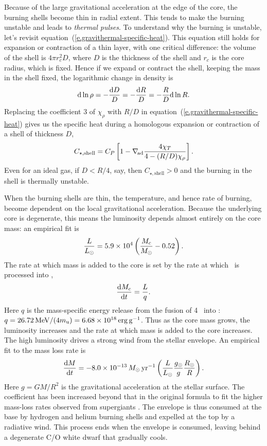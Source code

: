 Because of the large gravitational acceleration at the edge of the core, the burning shells become thin in radial extent.  This tends to make the burning unstable and leads to \emph{thermal pulses}.
To understand why the burning is unstable, let's revisit equation~(\ref{e.gravithermal-specific-heat}).  This equation still holds for expansion or contraction of a thin layer, with one critical difference: the volume of the shell is $4\pi r_{c}^{2}D$, where $D$ is the thickness of the shell and $r_{c}$ is the core radius, which is fixed. Hence if we expand or contract the shell, keeping the mass in the shell fixed, the logarithmic change in density is
\[ \mathrm{d}\ln\rho = -\frac{\mathrm{d} D}{D} = -\frac{\mathrm{d} R}{D} = -\frac{R}{D}\mathrm{d}\ln R. \]
Replacing the coefficient 3 of $\chi_{\rho}$ with $R/D$ in equation~(\ref{e.gravithermal-specific-heat}) gives us the specific heat during a homologous expansion or contraction of a shell of thickness $D$,
\begin{equation}\label{e.thin-shell-specific-heat}
 C_{\star,\mathrm{shell}} = C_{P}\left[1-\nabla_{\!\mathrm{ad}}\frac{4\chi_{T}}{4-(R/D)\chi_{\rho}}\right].
\end{equation}
Even for an ideal gas, if $D < R/4$, say, then $C_{\star,\mathrm{shell}} > 0$ and the burning in the shell is thermally unstable.

When the burning shells are thin, the temperature, and hence rate of burning, become dependent on the local gravitational acceleration.  Because the underlying core is degenerate, this means the luminosity depends almost entirely on the core mass: an empirical fit is \citep{Paczynski1970Evolution-of-Si}
\begin{equation}\label{e.paczynski}
\frac{L}{L_{\odot}} = 5.9\times 10^{4}\left(\frac{M_{c}}{M_\odot}-0.52\right).
\end{equation}
The rate at which mass is added to the core is set by the rate at which \hydrogen\ is processed into \helium,
\begin{equation}\label{e.mdot-core}
\frac{\mathrm{d} M_{c}}{\mathrm{d} t} = \frac{L}{q}.
\end{equation}
Here $q$ is the mass-specific energy release from the fusion of 4 \hydrogen\ into \helium: $q = 26.72\,\mathrm{M}\mathrm{eV}/(4m_\mathrm{u}) = 6.68\times 10^{18}\,\mathrm{erg}\,{\mathrm{g}}^{-1}$.  Thus as the core mass grows, the luminosity increases and the rate at which mass is added to the core increases.  The high luminosity drives a strong wind from the stellar envelope.  An empirical fit to the mass loss rate is \citep{Reimers1977On-the-absolute}
\begin{equation}\label{e.wind-loss}
\frac{\mathrm{d} M}{\mathrm{d} t} = - 8.0\times 10^{-13}\,M_\odot\,\mathrm{yr}^{-1} \left(\frac{L}{L_{\odot}}\frac{g_{\odot}}{g}\frac{R_{\odot}}{R}\right).
\end{equation}
Here $g = GM/R^{2}$ is the gravitational acceleration at the stellar surface.  The coefficient has been increased beyond that in the original \citet{Reimers1977On-the-absolute} formula to fit the higher mass-loss rates observed from supergiants \citep{Schroder2001The-galactic-ma}.  The envelope is thus consumed at the base by hydrogen and helium burning shells and expelled at the top by a radiative wind. This process ends when the envelope is consumed, leaving behind a degenerate C/O white dwarf that gradually cools.

